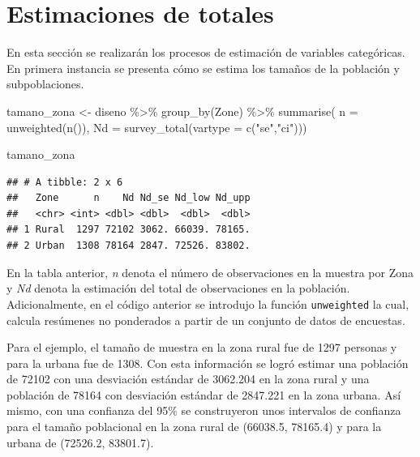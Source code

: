 \documentclass[
  12pt,
]{book}
\newenvironment{Shaded}{\begin{snugshade}}{\end{snugshade}}
\newcommand{\AttributeTok}[1]{\textcolor[rgb]{0.77,0.63,0.00}{#1}}
\newcommand{\FunctionTok}[1]{\textcolor[rgb]{0.00,0.00,0.00}{#1}}
\newcommand{\NormalTok}[1]{#1}
\newcommand{\OtherTok}[1]{\textcolor[rgb]{0.56,0.35,0.01}{#1}}
\newcommand{\SpecialCharTok}[1]{\textcolor[rgb]{0.00,0.00,0.00}{#1}}
\newcommand{\StringTok}[1]{\textcolor[rgb]{0.31,0.60,0.02}{#1}}
\begin{document}
\hypertarget{estimaciones-de-totales}{%
\section{Estimaciones de totales}\label{estimaciones-de-totales}}

En esta sección se realizarán los procesos de estimación de variables categóricas. En primera instancia se presenta cómo se estima los tamaños de la población y subpoblaciones.

\begin{Shaded}
\begin{Highlighting}[]
\NormalTok{tamano\_zona }\OtherTok{\textless{}{-}}\NormalTok{ diseno }\SpecialCharTok{\%\textgreater{}\%} \FunctionTok{group\_by}\NormalTok{(Zone) }\SpecialCharTok{\%\textgreater{}\%} 
               \FunctionTok{summarise}\NormalTok{( }\AttributeTok{n =} \FunctionTok{unweighted}\NormalTok{(}\FunctionTok{n}\NormalTok{()), }
                          \AttributeTok{Nd =} \FunctionTok{survey\_total}\NormalTok{(}\AttributeTok{vartype =} \FunctionTok{c}\NormalTok{(}\StringTok{"se"}\NormalTok{,}\StringTok{"ci"}\NormalTok{)))}

\NormalTok{tamano\_zona}
\end{Highlighting}
\end{Shaded}

\begin{verbatim}
## # A tibble: 2 x 6
##   Zone      n    Nd Nd_se Nd_low Nd_upp
##   <chr> <int> <dbl> <dbl>  <dbl>  <dbl>
## 1 Rural  1297 72102 3062. 66039. 78165.
## 2 Urban  1308 78164 2847. 72526. 83802.
\end{verbatim}

En la tabla anterior, \emph{n} denota el número de observaciones en la muestra por Zona y \emph{Nd} denota la estimación del total de observaciones en la población. Adicionalmente, en el código anterior se introdujo la función \texttt{unweighted} la cual, calcula resúmenes no ponderados a partir de un conjunto de datos de encuestas.

Para el ejemplo, el tamaño de muestra en la zona rural fue de 1297 personas y para la urbana fue de 1308. Con esta información se logró estimar una población de 72102 con una desviación estándar de 3062.204 en la zona rural y una población de 78164 con desviación estándar de 2847.221 en la zona urbana. Así mismo, con una confianza del 95\% se construyeron unos intervalos de confianza para el tamaño poblacional en la zona rural de (66038.5, 78165.4) y para la urbana de (72526.2, 83801.7).
\end{document}
